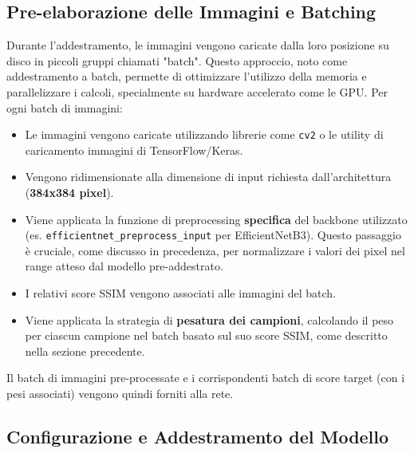 \subsection{Pre-elaborazione delle Immagini e Batching}

Durante l'addestramento, le immagini vengono caricate dalla loro posizione su disco in piccoli gruppi chiamati "batch". Questo approccio, noto come addestramento a batch, permette di ottimizzare l'utilizzo della memoria e parallelizzare i calcoli, specialmente su hardware accelerato come le GPU. Per ogni batch di immagini:
\begin{itemize}
    \item Le immagini vengono caricate utilizzando librerie come \texttt{cv2} o le utility di caricamento immagini di TensorFlow/Keras.
    \item Vengono ridimensionate alla dimensione di input richiesta dall'architettura (\textbf{384x384 pixel}).
    \item Viene applicata la funzione di preprocessing \textbf{specifica} del backbone utilizzato (es. \texttt{efficientnet\_preprocess\_input} per EfficientNetB3). Questo passaggio è cruciale, come discusso in precedenza, per normalizzare i valori dei pixel nel range atteso dal modello pre-addestrato.
    \item I relativi score SSIM vengono associati alle immagini del batch.
    \item Viene applicata la strategia di \textbf{pesatura dei campioni}, calcolando il peso per ciascun campione nel batch basato sul suo score SSIM, come descritto nella sezione precedente.
\end{itemize}
Il batch di immagini pre-processate e i corrispondenti batch di score target (con i pesi associati) vengono quindi forniti alla rete.

\subsection{Configurazione e Addestramento del Modello}

